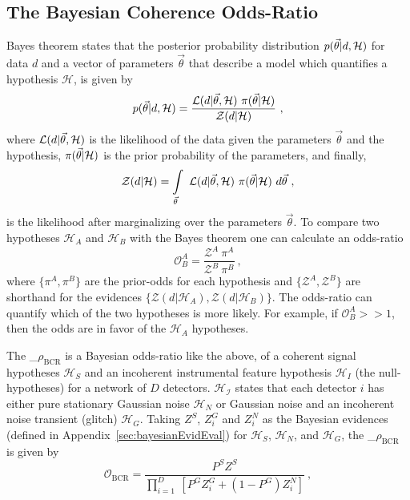 \documentclass[%
 nofootinbib,
 amsmath,amssymb,
 aps,
 twocolumn,
 superscriptaddress
]{revtex4-2}
\newcommand{\mathcmd}[1]{{\sc \relax\ifmmode#1\else $#1$\fi}\xspace}
\newcommand{\bcr}{\mathcmd{\rho_\text{BCR}}}
\newcommand{\parameters}{\mathcmd{\vec{\theta}}}
\begin{document}
\subsection{The Bayesian Coherence Odds-Ratio}

Bayes theorem states that the posterior probability distribution $p(\parameters|d,\mathcal{H})$ for data $d$ and a vector of parameters \parameters that describe a model which quantifies a hypothesis $\mathcal{H}$, is given by
\begin{equation}
p(\parameters|d,\mathcal{H}) = \frac{\mathcal{L}(d|\parameters, \mathcal{H}) \ \pi(\parameters | \mathcal{H})}{\mathcal{Z}(d|\mathcal{H})}\ , 
\end{equation}
where $\mathcal{L}(d|\parameters, \mathcal{H})$ is the likelihood of the data given the parameters \parameters and the hypothesis, $\pi(\parameters | \mathcal{H})$ is the prior probability of the parameters, and finally,
\begin{equation}
    \mathcal{Z}(d|\mathcal{H}) = \int\limits_{\parameters} \ \mathcal{L}(d|\parameters,\mathcal{H}) \ \pi(\parameters | \mathcal{H}) \ d\parameters\ ,
\end{equation} is the likelihood after marginalizing over the parameters \parameters.  To compare two hypotheses $\mathcal{H}_A$ and $\mathcal{H}_B$ with the Bayes theorem one can calculate an odds-ratio
\begin{equation}
    \mathcal{O}^A_B = \frac{\mathcal{Z}^A\ \pi^A}{\mathcal{Z}^B\ \pi^B}\ ,
\end{equation}
where  $\{\pi^A, \pi^B\}$ are the prior-odds for each hypothesis and $\{\mathcal{Z}^A, \mathcal{Z}^B\}$ are shorthand for the evidences $\{\mathcal{Z}(d|\mathcal{H}_A), \mathcal{Z}(d|\mathcal{H}_B)\}$. The odds-ratio can quantify which of the two hypotheses is more likely. For example, if $\mathcal{O}^A_B >> 1$, then the odds are in favor of the $\mathcal{H}_A$ hypotheses. 

The \bcr is a Bayesian odds-ratio like the above, of a coherent signal hypotheses $\mathcal{H}_S$ and an incoherent instrumental feature hypothesis $\mathcal{H}_I$ (the null-hypotheses) for a network of $D$ detectors. $\mathcal{H_I}$ states that each detector $i$ has either pure stationary Gaussian noise $\mathcal{H}_N$ or Gaussian noise and an incoherent noise transient (glitch) $\mathcal{H}_G$. Taking $Z^S$, $Z^G_i$ and $Z^N_i$ as the Bayesian evidences (defined in Appendix~\ref{sec:bayesianEvidEval}) for $\mathcal{H}_S$, $\mathcal{H}_N$, and $\mathcal{H}_G$, the \bcr is given by
\begin{equation}
\label{eq:bcr}
\mathcal{O}_{\mathrm{BCR}} = \frac{P^S Z^S}{\prod\limits^D_{i=1} \ [P^G Z^G_i + (1-P^G)Z^N_i]}\ ,
\end{equation}
\end{document}
